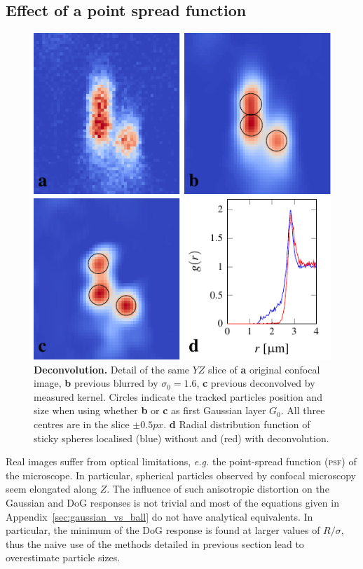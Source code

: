 \documentclass[8.5pt,twoside,twocolumn]{article}
\begin{document}
\subsection*{Effect of a point spread function}
\begin{figure}
\centering
\includegraphics{fig_deconv.pdf}
	\caption{\textbf{Deconvolution.} Detail of the same $YZ$ slice of \textbf{a} original confocal image, \textbf{b} previous blurred by $\sigma_0=1.6$, \textbf{c} previous deconvolved by measured kernel. Circles indicate the tracked particles position and size when using whether \textbf{b} or \textbf{c} as first Gaussian layer $G_0$. All three centres are in the slice $\pm \unit{0.5}{px}$. \textbf{d} Radial distribution function of sticky spheres localised (blue) without and (red) with deconvolution.}
	\label{fig:deconv}
\end{figure}

Real images suffer from optical limitations, \emph{e.g.} the point-spread function (\textsc{psf}) of the microscope. In particular, spherical particles observed by confocal microscopy seem elongated along $Z$. The influence of such anisotropic distortion on the Gaussian and DoG responses is not trivial and most of the equations given in Appendix~\ref{sec:gaussian_vs_ball} do not have analytical equivalents. In particular, the minimum of the DoG response is found at larger values of $R/\sigma$, thus the naive use of the methods detailed in previous section lead to overestimate particle sizes.
\end{document}
